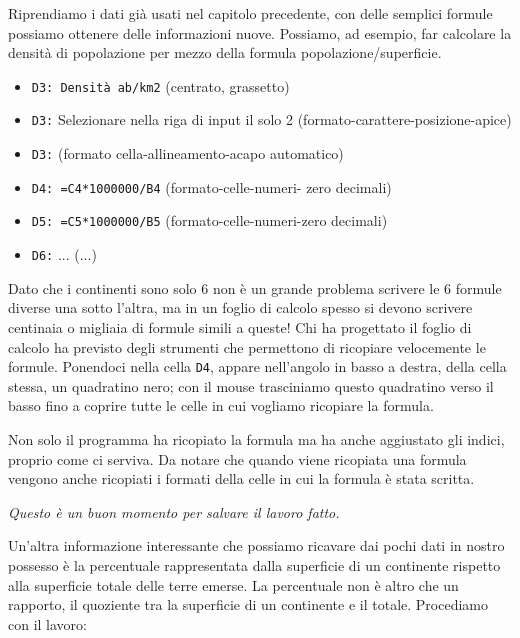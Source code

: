 Riprendiamo i dati già usati nel capitolo precedente, con delle semplici
formule possiamo ottenere delle informazioni nuove.
Possiamo, ad esempio, far calcolare la densità di popolazione per mezzo
della formula popolazione/superficie.

\begin{itemize}
\item {}
\texttt{D3: Densità ab/km2}
(centrato, grassetto)

\item {}
\texttt{D3:}
Selezionare nella riga di input il solo 2
(formato-carattere-posizione-apice)

\item {}
\texttt{D3:}
(formato cella-allineamento-acapo automatico)

\item {}
\texttt{D4: =C4*1000000/B4}
(formato-celle-numeri- zero decimali)

\item {}
\texttt{D5: =C5*1000000/B5}
(formato-celle-numeri-zero decimali)

\item {}
\texttt{D6:}
...
(...)
\end{itemize}

Dato che i continenti sono solo 6 non è un grande problema scrivere le 6
formule diverse una sotto l'altra, ma in un foglio di calcolo spesso si 
devono scrivere centinaia o migliaia di formule simili a queste!
Chi ha progettato il foglio di calcolo ha previsto degli strumenti che
permettono di ricopiare velocemente le formule.
Ponendoci nella cella \texttt{D4},
appare nell'angolo in basso a destra, della cella stessa, un quadratino nero;
con il mouse trasciniamo questo quadratino verso il basso fino a coprire
tutte le celle in cui vogliamo ricopiare la formula.

Non solo il programma ha ricopiato la formula ma ha anche aggiustato gli
indici, proprio come ci serviva.
Da notare che quando viene ricopiata una formula vengono anche ricopiati i
formati della celle in cui la formula è stata scritta.

\emph{Questo è un buon momento per salvare il lavoro fatto.}

Un'altra informazione interessante che possiamo ricavare dai pochi dati in
nostro possesso è la percentuale rappresentata dalla superficie di un
continente rispetto alla superficie totale delle terre emerse.
La percentuale non è altro che un rapporto, il quoziente tra la superficie
di un continente e il totale.
Procediamo con il lavoro:


